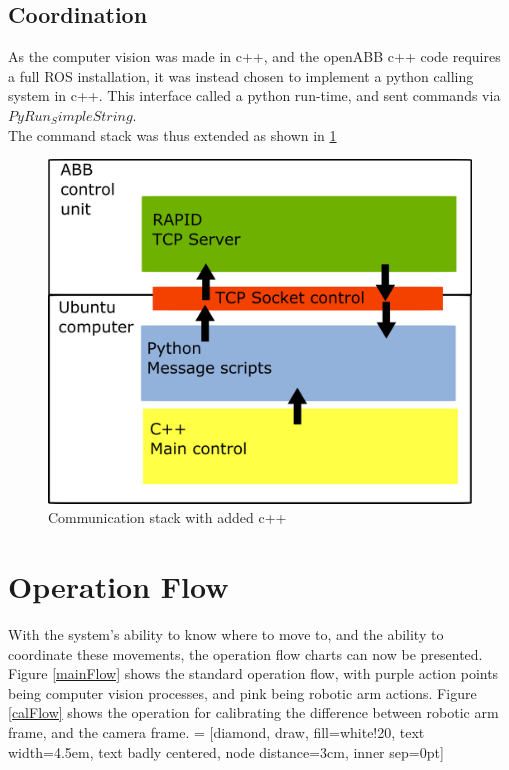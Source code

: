 \documentclass[11pt,a4paper]{report}
\begin{document}
\section{Coordination}
As the computer vision was made in c++, and the openABB c++ code requires a full ROS installation, it was instead chosen to implement a python calling system in c++. This interface called a python run-time, and sent commands via $PyRun_SimpleString$.\\
The command stack was thus extended as shown in \cref{fig:commstack2}
\begin{figure}[h]
\centering
\includegraphics[width=0.7\linewidth]{commstack2}
\caption{Communication stack with added c++}
\label{fig:commstack2}
\end{figure}
 
\chapter{Operation Flow}
With the system's ability to know where to move to, and the ability to coordinate these movements, the operation flow charts can now be presented. Figure \ref{mainFlow} shows the standard operation flow, with purple action points being computer vision processes, and pink being robotic arm actions. Figure \ref{calFlow} shows the operation for calibrating the difference between robotic arm frame, and the camera frame. 
 = [diamond, draw, fill=white!20, 
text width=4.5em, text badly centered, node distance=3cm, inner sep=0pt]
\end{document}
